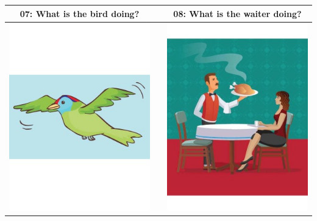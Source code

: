 \documentclass[12pt,notitlepage]{article}
\begin{document}
\begin{center}
\begin{tabular}{|c|c|c|}
\hline
07: What is the bird doing? && 08: What is the waiter doing? \\
\hline
\includegraphics[width=20em,trim=0 0 0 -3]{figures/I07.jpg} & & \includegraphics[width=20em,trim=0 0 0 -3]{figures/I08.jpg} \\
\hline
\end{tabular}
\vspace{1em} \\



\end{center}
\end{document}
